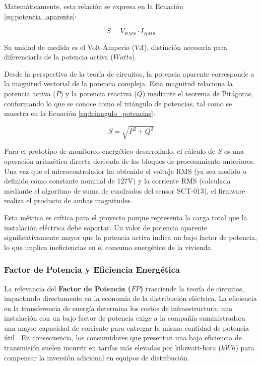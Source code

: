             Matemáticamente, esta relación se expresa en la Ecuación \ref{eq:potencia_aparente}:

            \begin{equation}
                S = V_{RMS} \cdot I_{RMS}
                \label{eq:potencia_aparente}
            \end{equation}

            Su unidad de medida es el Volt-Amperio ($VA$), distinción necesaria para diferenciarla de la potencia activa ($Watts$).

            Desde la perspectiva de la teoría de circuitos, la potencia aparente corresponde a la magnitud vectorial de la potencia compleja. Esta magnitud relaciona la potencia activa ($P$) y la potencia reactiva ($Q$) mediante el teorema de Pitágoras, conformando lo que se conoce como el triángulo de potencias, tal como se muestra en la Ecuación \ref{eq:triangulo_potencias}:

            \begin{equation}
                S = \sqrt{P^2 + Q^2}
                \label{eq:triangulo_potencias}
            \end{equation}

            Para el prototipo de monitoreo energético desarrollado, el cálculo de $S$ es una operación aritmética directa derivada de los bloques de procesamiento anteriores. Una vez que el microcontrolador ha obtenido el voltaje RMS (ya sea medido o definido como constante nominal de 127V) y la corriente RMS (calculada mediante el algoritmo de suma de cuadrados del sensor SCT-013), el firmware realiza el producto de ambas magnitudes.

            Esta métrica es crítica para el proyecto porque representa la carga total que la instalación eléctrica debe soportar. Un valor de potencia aparente significativamente mayor que la potencia activa indica un bajo factor de potencia, lo que implica ineficiencias en el consumo energético de la vivienda.

        \subsubsection{Factor de Potencia y Eficiencia Energética}
            La relevancia del \textbf{Factor de Potencia ($FP$)} trasciende la teoría de circuitos, impactando directamente en la economía de la distribución eléctrica. La eficiencia en la transferencia de energía determina los costos de infraestructura: una instalación con un bajo factor de potencia exige a la compañía suministradora una mayor capacidad de corriente para entregar la misma cantidad de potencia útil \cite{hayt2012}. En consecuencia, los consumidores que presentan una baja eficiencia de transmisión suelen incurrir en tarifas más elevadas por kilowatt-hora ($kWh$) para compensar la inversión adicional en equipos de distribución.

